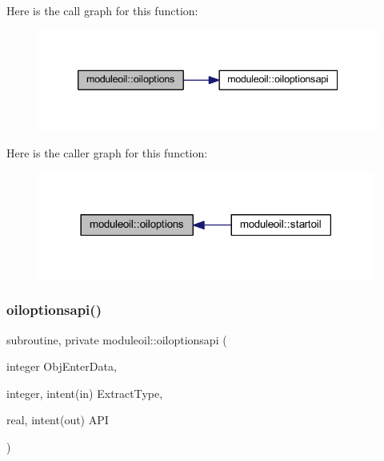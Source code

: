 Here is the call graph for this function\+:\nopagebreak
\begin{figure}[H]
\begin{center}
\leavevmode
\includegraphics[width=339pt]{namespacemoduleoil_aed259a357945d0fe3281c34d220a6dcd_cgraph}
\end{center}
\end{figure}
Here is the caller graph for this function\+:\nopagebreak
\begin{figure}[H]
\begin{center}
\leavevmode
\includegraphics[width=314pt]{namespacemoduleoil_aed259a357945d0fe3281c34d220a6dcd_icgraph}
\end{center}
\end{figure}
\mbox{\label{namespacemoduleoil_a25b9c130249a4691ccc1c06b3bae5a4e}} 
\subsubsection{\texorpdfstring{oiloptionsapi()}{oiloptionsapi()}}
{\footnotesize\ttfamily subroutine, private moduleoil\+::oiloptionsapi (\begin{DoxyParamCaption}\item[{integer}]{Obj\+Enter\+Data,  }\item[{integer, intent(in)}]{Extract\+Type,  }\item[{real, intent(out)}]{A\+PI }\end{DoxyParamCaption})\hspace{0.3cm}{\ttfamily [private]}}

